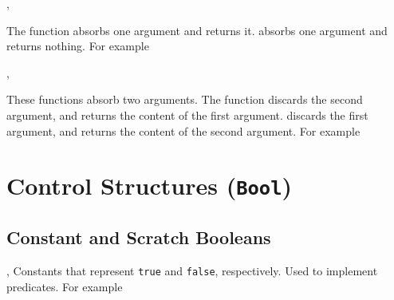 \documentclass[oneside]{book}
\let\tn=\cs
\begin{document}
\begin{function}{\UseOne,\GobbleOne}
\begin{syntax}
 
 
\end{syntax}
The function  absorbs one argument and returns it.
 absorbs one argument and returns nothing.
For example
\begin{demohigh}
\end{demohigh}
\end{function}

\begin{function}{\UseGobble,\GobbleUse}
\begin{syntax}
  
  
\end{syntax}
These functions absorb two arguments.
The function  discards the second argument,
and returns the content of the first argument.
 discards the first argument,
and returns the content of the second argument.
For example
\begin{demohigh}
\end{demohigh}
\end{function}

\chapter{Control Structures (\texttt{Bool})}

\section{Constant and Scratch Booleans}

\begin{variable}{\cTrueBool,\cFalseBool}
Constants that represent \verb|true| and \verb|false|, respectively. Used to
implement predicates. For example
\begin{demohigh}
\BoolVarIfTF {} {}
\BoolVarIfTF {} {}
\end{demohigh}
\end{variable}
\end{document}
